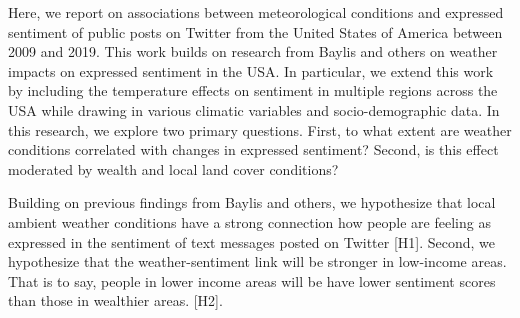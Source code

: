 \documentclass{article}
\begin{document}
Here, we report on associations between meteorological conditions and expressed sentiment of public posts on Twitter from the United States of America between 2009 and 2019. This work builds on research from Baylis and others \cite{baylis_weather_2018} on weather impacts on expressed sentiment in the USA. In particular, we extend this work by including the temperature effects on sentiment in multiple regions across the USA while drawing in various climatic variables and socio-demographic data. In this research, we explore two primary questions. First, to what extent are weather conditions correlated with changes in expressed sentiment? Second, is this effect moderated by wealth and local land cover conditions?

Building on previous findings from Baylis and others, we hypothesize that local ambient weather conditions have a strong connection how people are feeling as expressed in the sentiment of text messages posted on Twitter [H1]. Second, we hypothesize that the weather-sentiment link will be stronger in low-income areas. That is to say, people in lower income areas will be have lower sentiment scores than those in wealthier areas. [H2].
\end{document}
